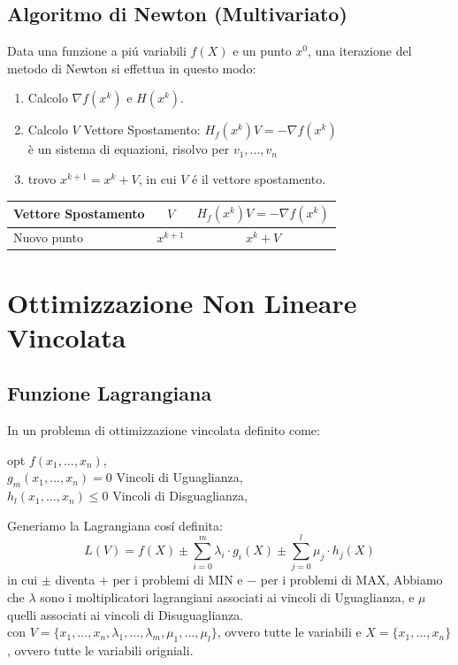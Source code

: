 \documentclass[12pt, a4paper, openany]{book}
\begin{document}
\section{Algoritmo di Newton (Multivariato)}
Data una funzione a piú variabili $f(X)$ e un punto $x^0$, una iterazione del metodo di Newton si effettua in questo modo:
\begin{enumerate}
	\item Calcolo $\nabla f(x^k)$ e $H(x^k)$.
	\item Calcolo $V$ Vettore Spostamento: $H_f(x^k) V = - \nabla f(x^k)$
		\\ \small{è un sistema di equazioni, risolvo per $v_1,...,v_n$}
	\item trovo $x^{k+1} = x^k + V$, in cui $V$ é il vettore spostamento.
\end{enumerate}

\begin{center}
	\begin{tabular}{|l|c|c|}
		\hline
		Vettore Spostamento &$V$& $H_f(x^k) V = - \nabla f(x^k)$\\
		\hline
		Nuovo punto & $x^{k+1}$ & $ x^k + V $\\
		\hline
	\end{tabular}
\end{center}


\chapter{Ottimizzazione Non Lineare Vincolata}
\section{Funzione Lagrangiana}
In un problema di ottimizzazione vincolata definito come:
\begin{center}
	opt $f(x_1,...,x_n)$,
	\\
	$g_m(x_1,...,x_n) = 0$ Vincoli di Uguaglianza,
	\\
	$h_l(x_1,...,x_n) \leq 0$ Vincoli di Disguaglianza,
\end{center}
Generiamo la Lagrangiana cosí definita:
\[
	L(V) = f(X) \pm \sum_{i=0}^{m} \lambda_i \cdot g_i(X) \pm \sum_{j=0}^{l} \mu_j \cdot h_j(X)
\]
in cui $\pm$ diventa $+$ per i problemi di MIN e $-$ per i problemi di MAX,
Abbiamo che $\lambda$ sono i moltiplicatori lagrangiani associati ai vincoli di Uguaglianza, e $\mu$ quelli associati ai vincoli di Disuguaglianza.
\\\small{con $V=\{x_1,...,x_n,\lambda_1,...,\lambda_m, \mu_1,...,\mu_l\}$, ovvero tutte le variabili e $X=\{x_1,...,x_n\}$, ovvero tutte le variabili origniali.}
\end{document}
